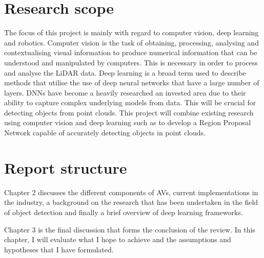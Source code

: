 \section{Research scope}
The focus of this project is mainly with regard to computer vision, deep learning and robotics. Computer vision is the task of obtaining, processing, analysing and contextualising visual information to produce numerical information that can be understood and manipulated by computers. This is necessary in order to process and analyse the LiDAR data. Deep learning is a broad term used to describe methods that utilise the use of deep neural networks that have a large number of layers. DNNs have become a heavily researched an invested area due to their ability to capture complex underlying models from data. This will be crucial for detecting objects from point clouds. 
This project will combine existing research using computer vision and deep learning such as \cite{qi2017pointnet}\cite{zhou2017voxelnet} to develop a Region Proposal Network capable of accurately detecting objects in point clouds. 


\section{Report structure}

Chapter 2 discusses the different components of AVs, current implementations in the industry, a background on the research that has been undertaken in the field of object detection and finally a brief overview of deep learning frameworks. 

Chapter 3 is the final discussion that forms the conclusion of the review. In this chapter, I will evaluate what I hope to achieve and the assumptions and hypotheses that I have formulated. 


